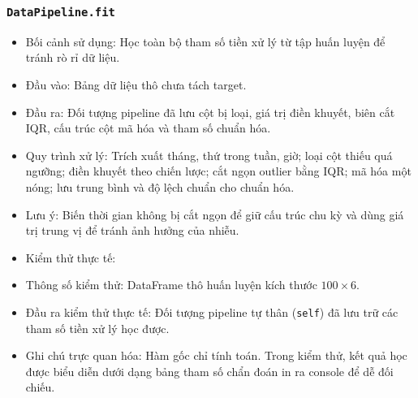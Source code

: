 \documentclass[a4paper]{article}
\newcommand{\code}[1]{\colorbox{light-gray}{\texttt{#1}}}
\begin{document}
\subsubsection{\code{DataPipeline.fit}}
\begin{itemize}[leftmargin=*]
    \item Bối cảnh sử dụng: Học toàn bộ tham số tiền xử lý từ tập huấn luyện để tránh rò rỉ dữ liệu.
    \item Đầu vào: Bảng dữ liệu thô chưa tách target.
    \item Đầu ra: Đối tượng pipeline đã lưu cột bị loại, giá trị điền khuyết, biên cắt IQR, cấu trúc cột mã hóa và tham số chuẩn hóa.
    \item Quy trình xử lý: Trích xuất tháng, thứ trong tuần, giờ; loại cột thiếu quá ngưỡng; điền khuyết theo chiến lược; cắt ngọn outlier bằng IQR; mã hóa một nóng; lưu trung bình và độ lệch chuẩn cho chuẩn hóa.
    \item Lưu ý: Biến thời gian không bị cắt ngọn để giữ cấu trúc chu kỳ và dùng giá trị trung vị để tránh ảnh hưởng của nhiễu.
    \item Kiểm thử thực tế:
    \item Thông số kiểm thử: DataFrame thô huấn luyện kích thước $100 \times 6$.
    \item Đầu ra kiểm thử thực tế: Đối tượng pipeline tự thân (\texttt{self}) đã lưu trữ các tham số tiền xử lý học được.
    \item Ghi chú trực quan hóa: Hàm gốc chỉ tính toán. Trong kiểm thử, kết quả học được biểu diễn dưới dạng bảng tham số chẩn đoán in ra console để dễ đối chiếu.
\end{itemize}
\end{document}
